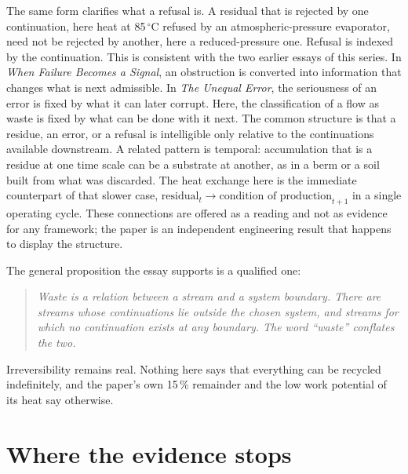 \documentclass[11pt]{article}
\theoremstyle{definition}
\theoremstyle{remark}
\begin{document}
The same form clarifies what a refusal is. A residual that is rejected by one continuation, here heat at 85\,$^{\circ}$C refused by an atmospheric-pressure evaporator, need not be rejected by another, here a reduced-pressure one. Refusal is indexed by the continuation. This is consistent with the two earlier essays of this series. In \emph{When Failure Becomes a Signal}, an obstruction is converted into information that changes what is next admissible. In \emph{The Unequal Error}, the seriousness of an error is fixed by what it can later corrupt. Here, the classification of a flow as waste is fixed by what can be done with it next. The common structure is that a residue, an error, or a refusal is intelligible only relative to the continuations available downstream. A related pattern is temporal: accumulation that is a residue at one time scale can be a substrate at another, as in a berm or a soil built from what was discarded. The heat exchange here is the immediate counterpart of that slower case, $\text{residual}_t\to\text{condition of production}_{t+1}$ in a single operating cycle. These connections are offered as a reading and not as evidence for any framework; the paper is an independent engineering result that happens to display the structure.

The general proposition the essay supports is a qualified one:
\begin{quote}
\emph{Waste is a relation between a stream and a system boundary. There are streams whose continuations lie outside the chosen system, and streams for which no continuation exists at any boundary. The word ``waste'' conflates the two.}
\end{quote}
Irreversibility remains real. Nothing here says that everything can be recycled indefinitely, and the paper's own 15\,\% remainder and the low work potential of its heat say otherwise.

\section{Where the evidence stops}
\end{document}
